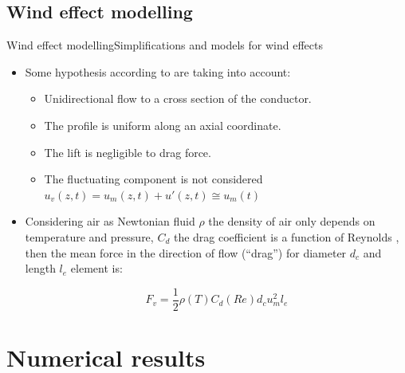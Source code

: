 \documentclass{beamer}
\begin{document}

\subsection{Wind effect modelling}
\begin{frame}{Wind effect modelling}{Simplifications and models for wind effects}


\begin{itemize}
  \item Some hypothesis according to \cite{Stengel2017a} are taking into account: 
  \begin{itemize}
      \item Unidirectional flow to a cross section of the conductor.
      \item The profile is uniform along an axial coordinate.
      \item The lift is negligible to drag force.
      \item The fluctuating component is not considered $u_v(z,t)=u_m(z,t)+{u}'(z,t)\cong u_m(t) $
  \end{itemize}

  \pause
  \item Considering air as Newtonian fluid  $\rho$ the density of air only depends on temperature and pressure, $C_d$ the drag coefficient is a function of Reynolds , then the mean force in the direction of flow (``drag'')  for diameter $d_c$ and length $l_e$ element is:
\begin{center}
	\begin{equation}
	\label{eqn:FuerzaViento}
	F_v=\frac{1}{2}\rho (T)C_d(Re)d_cu_m^2l_{e}
	\end{equation}
\end{center}
  
    \end{itemize}
\end{frame}






\section{Numerical results}
\end{document}
